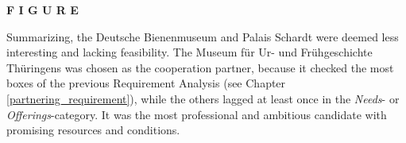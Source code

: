 \textbf{F I G U R E}

Summarizing, the Deutsche Bienenmuseum and Palais Schardt were deemed less interesting and lacking feasibility. The Museum für Ur- und Frühgeschichte Thüringens was chosen as the cooperation partner, because it checked the most boxes of the previous Requirement Analysis (see Chapter \ref{partnering_requirement}), while the others lagged at least once in the \textit{Needs}- or \textit{Offerings}-category. It was the most professional and ambitious candidate with promising resources and conditions.

%

